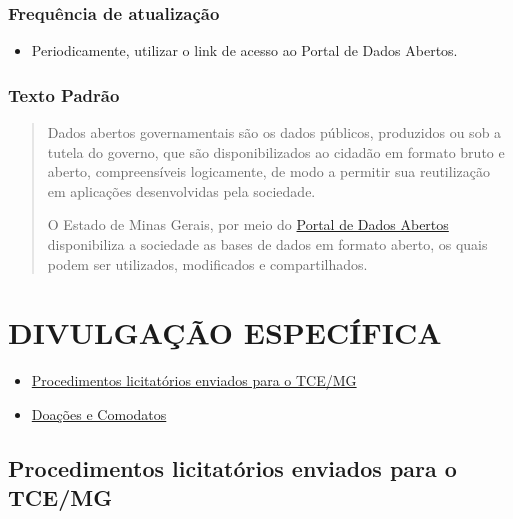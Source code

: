 \documentclass[
]{book}
\providecommand{\tightlist}{%
  \setlength{\itemsep}{0pt}\setlength{\parskip}{0pt}}
\begin{document}
\hypertarget{frequuxeancia-de-atualizauxe7uxe3o-9}{%
\subsection{Frequência de atualização}\label{frequuxeancia-de-atualizauxe7uxe3o-9}}

\begin{itemize}
\tightlist
\item
  Periodicamente, utilizar o link de acesso ao Portal de Dados Abertos.
\end{itemize}

\hypertarget{texto-padruxe3o-10}{%
\subsection{Texto Padrão}\label{texto-padruxe3o-10}}

\begin{quote}
Dados abertos governamentais são os dados públicos, produzidos ou sob a tutela do governo, que são disponibilizados ao cidadão em formato bruto e aberto, compreensíveis logicamente, de modo a permitir sua reutilização em aplicações desenvolvidas pela sociedade.

O Estado de Minas Gerais, por meio do \href{http://dados.mg.gov.br/}{Portal de Dados Abertos} disponibiliza a sociedade as bases de dados em formato aberto, os quais podem ser utilizados, modificados e compartilhados.
\end{quote}

\hypertarget{divulgauxe7uxe3o-especuxedfica}{%
\chapter{DIVULGAÇÃO ESPECÍFICA}\label{divulgauxe7uxe3o-especuxedfica}}

\begin{itemize}
\tightlist
\item
  \href{tce.html}{Procedimentos licitatórios enviados para o TCE/MG}
\item
  \href{doacoes.html}{Doações e Comodatos}
\end{itemize}

\hypertarget{procedimentos-licitatuxf3rios-enviados-para-o-tcemg}{%
\section{Procedimentos licitatórios enviados para o TCE/MG}\label{procedimentos-licitatuxf3rios-enviados-para-o-tcemg}}
\end{document}
